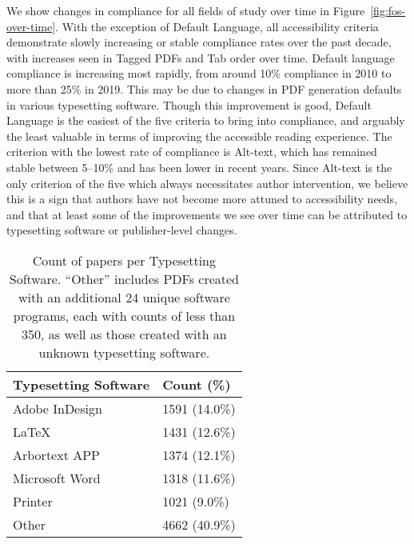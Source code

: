 We show changes in compliance for all fields of study over time in Figure~\ref{fig:fos-over-time}. With the exception of Default Language, all accessibility criteria demonstrate slowly increasing or stable compliance rates over the past decade, with increases seen in Tagged PDFs and Tab order over time. Default language compliance is increasing most rapidly, from around 10\% compliance in 2010 to more than 25\% in 2019. This may be due to changes in PDF generation defaults in various typesetting software. Though this improvement is good, Default Language is the easiest of the five criteria to bring into compliance, and arguably the least valuable in terms of improving the accessible reading experience. The criterion with the lowest rate of compliance is Alt-text, which has remained stable between 5--10\% and has been lower in recent years. Since Alt-text is the only criterion of the five which always necessitates author intervention, we believe this is a sign that authors have not become more attuned to accessibility needs, and that at least some of the improvements we see over time can be attributed to typesetting software or publisher-level changes. 


\begin{table}[t!]
\begin{tabular}{ll}
    \toprule
        \textbf{Typesetting Software} & \textbf{Count (\%)} \\ 
    \midrule
        Adobe InDesign       & 1591 (14.0\%) \\
        LaTeX                & 1431 (12.6\%) \\
        Arbortext APP        & 1374 (12.1\%) \\
        Microsoft Word       & 1318 (11.6\%) \\
        Printer              & 1021 (9.0\%) \\
    \midrule
        Other                & 4662 (40.9\%) \\
    \bottomrule
\end{tabular}
\caption{Count of papers per Typesetting Software. ``Other'' includes PDFs created with an additional 24 unique software programs, each with counts of less than 350, as well as those created with an unknown typesetting software.}
\label{tab:dist-of-headers}
\end{table}

